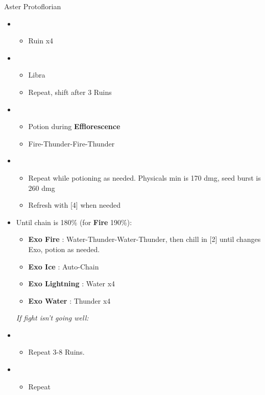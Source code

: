 \begin{battle}[1:43]{Aster Protoflorian}
		\begin{itemize}
			\item \first
			      \begin{itemize}
				      \item Ruin x4
			      \end{itemize}
			\item \third
			      \begin{itemize}
				      \item Libra
				      \item Repeat, shift after 3 Ruins
			      \end{itemize}
			\item \fourth
			      \begin{itemize}
				      \item Potion during \textbf{Efflorescence}
				      \item Fire-Thunder-Fire-Thunder
			      \end{itemize}
			\item \fifth
			      \begin{itemize}
				      \item Repeat while potioning as needed. Physicals min is 170 dmg, seed burst is 260 dmg
				      \item Refresh with [4] when needed
			      \end{itemize}
			\item Until chain is 180\% (for \textbf{Fire} 190\%):
			      \begin{itemize}
				      \item \textbf{Exo Fire} : Water-Thunder-Water-Thunder, then chill in [2] until changes Exo, potion as needed.
				      \item \textbf{Exo Ice} : Auto-Chain
				      \item \textbf{Exo Lightning} : Water x4
				      \item \textbf{Exo Water} : Thunder x4
			      \end{itemize}
			      {\it If fight isn't going well:}
			\item \first
			      \begin{itemize}
				      \item Repeat 3-8 Ruins.
			      \end{itemize}
			\item \fourth
			      \begin{itemize}
				      \item Repeat

\end{itemize}
\end{itemize}
\end{battle}
